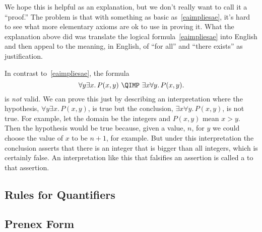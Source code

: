 We hope this is helpful as an explanation, but we don't really want to
call it a ``proof.''  The problem is that with something as basic
as~\eqref{eaimpliesae}, it's hard to see what more elementary axioms
are ok to use in proving it.  What the explanation above did was
translate the logical formula~\eqref{eaimpliesae} into English and
then appeal to the meaning, in English, of ``for all'' and ``there
exists'' as justification.

\iffalse
So this wasn't a proof, just an explanation intended to make 
what~\eqref{eaimpliesae} means, it becomes obvious.
\fi

In contrast to~\eqref{eaimpliesae}, the formula
\begin{equation}\label{aenotimplyea}
\forall y \exists x.\, P(x,y)\ \QIMP\ \exists x \forall y.\, P(x,y).
\end{equation}
is \emph{not} valid.  We can prove this just by describing an
interpretation where the hypothesis, $\forall y \exists x.\, P(x,y)$, is
true but the conclusion, $\exists x \forall y.\, P(x,y)$, is not true.
For example, let the domain be the integers and $P(x,y)$ mean $x > y$.
Then the hypothesis would be true because, given a value, $n$, for $y$ we
could choose the value of $x$ to be $n+1$, for example.  But under this
interpretation the conclusion asserts that there is an integer that is
bigger than all integers, which is certainly false.  An interpretation
like this that falsifies an assertion is called a  to
that assertion.

\begin{problems}

\practiceproblems
{}

\classproblems
{}

\homeworkproblems
{}

\examproblems
{}

\end{problems}

\begin{editingnotes}
\section{Rules for Quantifiers}

\subsection{Prenex Form}

\end{editingnotes}

\endinput
